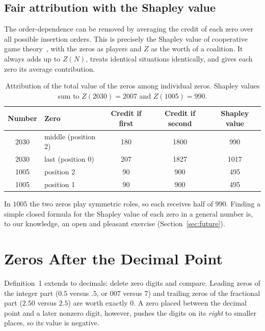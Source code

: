 \documentclass[11pt,a4paper]{article}
\theoremstyle{definition}
\newcommand{\Zv}{Z}   %
\begin{document}
\subsection{Fair attribution with the Shapley value}
The order-dependence can be removed by averaging the credit of each zero over all possible insertion orders. This is precisely the Shapley value of cooperative game theory~\cite{shapley}, with the zeros as players and $\Zv$ as the worth of a coalition. It always adds up to $\Zv(N)$, treats identical situations identically, and gives each zero its average contribution.

\begin{table}[ht]
\centering\small
\begin{tabular}{@{}cl ccc@{}}
\toprule
Number & Zero & Credit if first & Credit if second & Shapley value \\
\midrule
2030 & middle (position 2) & 180 & 1800 & 990 \\
2030 & last (position 0)   & 207 & 1827 & 1017 \\
1005 & position 2          & 90  & 900  & 495 \\
1005 & position 1          & 90  & 900  & 495 \\
\bottomrule
\end{tabular}
\caption{Attribution of the total value of the zeros among individual zeros. Shapley values sum to $\Zv(2030)=2007$ and $\Zv(1005)=990$.}
\label{tab:shapley}
\end{table}

In $1005$ the two zeros play symmetric roles, so each receives half of $990$. Finding a simple closed formula for the Shapley value of each zero in a general number is, to our knowledge, an open and pleasant exercise (Section~\ref{sec:future}).

\section{Zeros After the Decimal Point}\label{sec:decimal}

Definition~1 extends to decimals: delete zero digits and compare. Leading zeros of the integer part ($0.5$ versus $.5$, or $007$ versus $7$) and trailing zeros of the fractional part ($2.50$ versus $2.5$) are worth exactly $0$. A zero placed between the decimal point and a later nonzero digit, however, pushes the digits on its \emph{right} to smaller places, so its value is negative.
\end{document}
